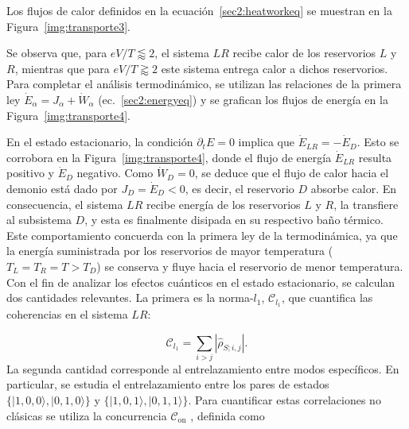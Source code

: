 Los flujos de calor definidos en la ecuación~\eqref{sec2:heatworkeq} se muestran en la Figura~\ref{img:transporte3}.  

    
Se observa que, para $eV/T \lessapprox 2$, el sistema $LR$ recibe calor de los reservorios $L$ y $R$, mientras que para $eV/T \gtrapprox 2$ este sistema entrega calor a dichos reservorios.  
\\

Para completar el análisis termodinámico, se utilizan las relaciones de la primera ley $\dot{E}_{\alpha} = J_{\alpha} + \dot{W}_{\alpha}$ (ec.~\eqref{sec2:energyeq}) y se grafican los flujos de energía en la Figura~\ref{img:transporte4}.  


En el estado estacionario, la condición $\partial_t E = 0$ implica que $\dot{E}_{LR} = -\dot{E}_D$. Esto se corrobora en la Figura~\ref{img:transporte4}, donde el flujo de energía $\dot{E}_{LR}$ resulta positivo y $\dot{E}_D$ negativo. Como $\dot{W}_{D} = 0$, se deduce que el flujo de calor hacia el demonio está dado por $J_D = \dot{E}_D < 0$, es decir, el reservorio $D$ absorbe calor. En consecuencia, el sistema $LR$ recibe energía de los reservorios $L$ y $R$, la transfiere al subsistema $D$, y esta es finalmente disipada en su respectivo baño térmico. Este comportamiento concuerda con la primera ley de la termodinámica, ya que la energía suministrada por los reservorios de mayor temperatura ($T_L = T_R = T > T_D$) se conserva y fluye hacia el reservorio de menor temperatura.  
\\

Con el fin de analizar los efectos cuánticos en el estado estacionario, se calculan dos cantidades relevantes. La primera es la norma-$l_{1}$, $\mathcal{C}_{l_{1}}$, que cuantifica las coherencias en el sistema $LR$:  

\[
\mathcal{C}_{l_{1}} = \sum_{i> j} |\hat{\rho}_{S;i,j}|.
\]
La segunda cantidad corresponde al entrelazamiento entre modos específicos. En particular, se estudia el entrelazamiento entre los pares de estados $\{|1,0,0\rangle, |0,1,0\rangle\}$ y $\{|1,0,1\rangle, |0,1,1\rangle\}$. Para cuantificar estas correlaciones no clásicas se utiliza la concurrencia $\mathcal{C}_{\text{on}}$ \cite{hill1997entanglement, wootters1998entanglement}, definida como  

